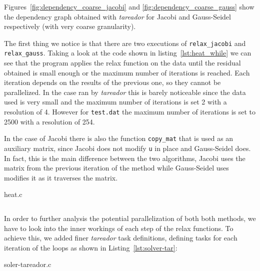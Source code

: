 Figures~\ref{fig:dependency_coarse_jacobi} and \ref{fig:dependency_coarse_gauss}
show the dependency graph obtained with \emph{tareador} for Jacobi and Gauss-Seidel
respectively (with very coarse granularity).

The first thing we notice is that there are two executions of
\texttt{relax\_jacobi} and \texttt{relax\_gauss}.  Taking a look at the code
shown in listing~\ref{lst:heat_while} we can see that the program applies the
relax function on the data until the residual obtained is small enough or the
maximum number of iterations is reached. Each iteration depends on the results
of the previous one, so they cannot be parallelized. In the case ran by
\emph{tareador} this is barely noticeable since the data used is very small and
the maximum number of iterations is set 2 with a resolution of 4. However for
\texttt{test.dat} the maximum number of iterations is set to 2500 with a resolution
of 254.

In the case of Jacobi there is also the function \texttt{copy\_mat} that is
used as an auxiliary matrix, since Jacobi does not modify \texttt{u} in place
and Gauss-Seidel does.  In fact, this is the main difference between the two
algorithms, Jacobi uses the matrix from the previous iteration of the method
while Gauss-Seidel uses modifies it as it traverses the matrix.

\begin{listing}[H]
\caption{heat.c}%
\label{lst:heat_while}
\inputminted[firstline=83,lastline=104]{c}{code/heat.c}
\end{listing}

In order to further analysis the potential parallelization of both both methods,
we have to look into the inner workings of each step of the relax functions. To
achieve this, we added finer \emph{tareador} task definitions, defining tasks
for each iteration of the loops as shown in Listing~\ref{lst:solver-tar}:

\begin{listing}[H]
\caption{soler-tareador.c}%
\label{lst:solver-tar}
\inputminted[firstline=28,lastline=43]{c}{code/solver-tareador.c}
\vspace{-2.5em}
\inputminted[firstline=56,lastline=72]{c}{code/solver-tareador.c}
\end{listing}

